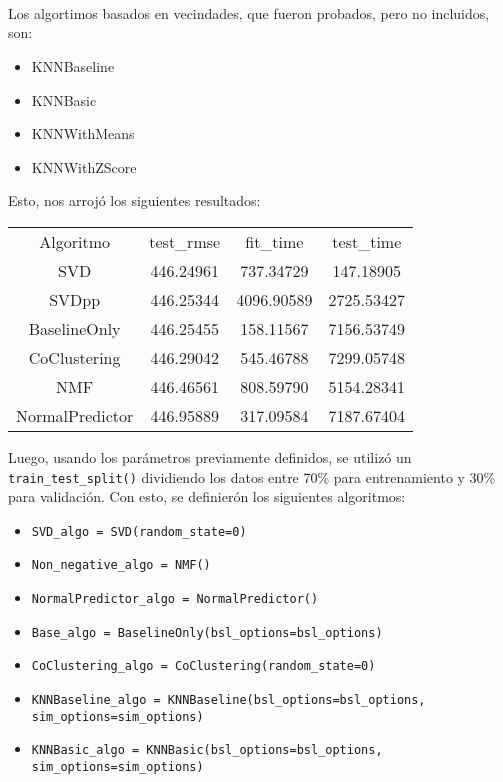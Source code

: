 \documentclass{article}
\begin{document}
\\
\\

\\

Los algortimos basados en vecindades, que fueron probados, pero no incluidos, son:

\begin{itemize}
    \item KNNBaseline
    \item KNNBasic
    \item KNNWithMeans
    \item KNNWithZScore
\end{itemize}

Esto, nos arrojó los siguientes resultados:

\begin{center}
\begin{tabular}{ c c c c }
Algoritmo & test_rmse & fit_time & test_time\\
SVD & 446.24961 & 737.34729 & 147.18905\\
SVDpp & 446.25344 & 4096.90589 & 2725.53427\\
BaselineOnly & 446.25455 & 158.11567 & 7156.53749\\
CoClustering & 446.29042 & 545.46788 & 7299.05748\\
NMF & 446.46561 & 808.59790 & 5154.28341\\
NormalPredictor & 446.95889 & 317.09584 & 7187.67404
\end{tabular}
\end{center}

Luego, usando los parámetros previamente definidos, se utilizó un \verb|train_test_split()| dividiendo los datos entre 70\% para entrenamiento y 30\% para validación.
Con esto, se definierón los siguientes algoritmos:

\begin{itemize}
    \item \verb|SVD_algo = SVD(random_state=0)|
    \item \verb|Non_negative_algo = NMF()|
    \item \verb|NormalPredictor_algo = NormalPredictor()|
    \item \verb|Base_algo = BaselineOnly(bsl_options=bsl_options)|
    \item \verb|CoClustering_algo = CoClustering(random_state=0)|
    \item \verb|KNNBaseline_algo = KNNBaseline(bsl_options=bsl_options, sim_options=sim_options)|
    \item \verb|KNNBasic_algo = KNNBasic(bsl_options=bsl_options, sim_options=sim_options)|
\end{itemize}
\end{document}
